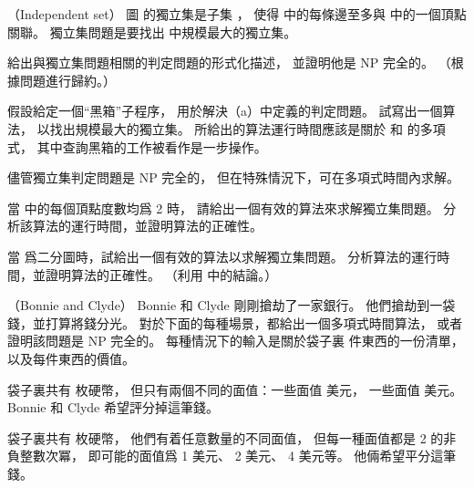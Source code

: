 \startsubject[
  title={Problems},
]

\startPROBLEM
（Independent set）
圖  的{\EMP 獨立集}是子集 ，
使得  中的每條邊至多與  中的一個頂點關聯。
{\EMP 獨立集問題}是要找出  中規模最大的獨立集。

\startigBase[a]\startitem
給出與獨立集問題相關的判定問題的形式化描述，
並證明他是 NP 完全的。
（\hint 根據問題進行歸約。）
\stopitem\stopigBase

\startANSWER
{}
\stopANSWER

\startigBase[continue]\startitem
假設給定一個“黑箱”子程序，
用於解決（a）中定義的判定問題。
試寫出一個算法，
以找出規模最大的獨立集。
所給出的算法運行時間應該是關於  和  的多項式，
其中查詢黑箱的工作被看作是一步操作。
\stopitem\stopigBase

\startANSWER
{}
\stopANSWER

儘管獨立集判定問題是 NP 完全的，
但在特殊情況下，可在多項式時間內求解。

\startigBase[continue]\startitem
當  中的每個頂點度數均爲 2 時，
請給出一個有效的算法來求解獨立集問題。
分析該算法的運行時間，並證明算法的正確性。
\stopitem\stopigBase

\startANSWER
{}
\stopANSWER

\startigBase[continue]\startitem
當  爲二分圖時，試給出一個有效的算法以求解獨立集問題。
分析算法的運行時間，並證明算法的正確性。
（\hint 利用 中的結論。）
\stopitem\stopigBase

\startANSWER
{}
\stopANSWER
\stopPROBLEM

\startPROBLEM
（Bonnie and Clyde）
 Bonnie 和 Clyde 剛剛搶劫了一家銀行。
他們搶劫到一袋錢，並打算將錢分光。
對於下面的每種場景，都給出一個多項式時間算法，
或者證明該問題是 NP 完全的。
每種情況下的輸入是關於袋子裏  件東西的一份清單，
以及每件東西的價值。

\startigBase[a]\startitem
袋子裏共有  枚硬幣，
但只有兩個不同的面值：一些面值  美元，
一些面值  美元。
 Bonnie 和 Clyde 希望評分掉這筆錢。
\stopitem\stopigBase

\startANSWER
{}
\stopANSWER

\startigBase[continue]\startitem
袋子裏共有  枚硬幣，
他們有着任意數量的不同面值，
但每一種面值都是 2 的非負整數次冪，
即可能的面值爲 1 美元、 2 美元、 4 美元等。
他倆希望平分這筆錢。
\stopitem\stopigBase

\startANSWER
{}
\stopANSWER

